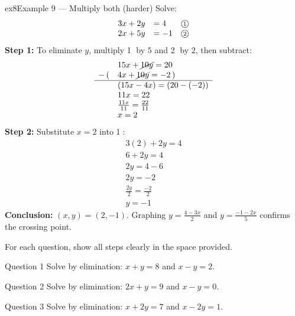 \documentclass[11pt]{article}
\begin{document}
\begin{example}{ex8}{Example 9 --- Multiply both (harder)}
Solve:\[\begin{array}{rll} 3x+2y & = 4 & \text{\textcircled{\scriptsize 1}}\\ 2x+5y & = -1 & \text{\textcircled{\scriptsize 2}} \end{array}\]\soln
\textbf{Step 1:} To eliminate $y$, multiply \textcircled{\scriptsize 1} by $5$ and \textcircled{\scriptsize 2} by $2$, then subtract:\[\begin{array}{rl} & 15x+\cancel{10y}=20\\ -\,( & 4x+\cancel{10y}=-2\,)\\ \hline & (15x-4x)=(20-(-2))\\ & 11x=22\\ & \frac{11x}{11}=\frac{22}{11}\\ & x=2 \end{array}\]
\textbf{Step 2:} Substitute $x=2$ into \textcircled{\scriptsize 1}:\[\begin{array}{l} 3(2)+2y=4\\ 6+2y=4\\ 2y=4-6\\ 2y=-2\\ \frac{2y}{2}=\frac{-2}{2}\\ y=-1 \end{array}\]
\textbf{Conclusion:} $(x,y)=(2,-1)$.
Graphing $y=\tfrac{4-3x}2$ and $y=\tfrac{-1-2x}5$ confirms the crossing point.
\end{example}

\clearpage
{}
For each question, show all steps clearly in the space provided.

\begin{qbox}{Question 1}
Solve by elimination: $x+y=8$ and $x-y=2$.\workspace{2.4cm}
\end{qbox}

\begin{qbox}{Question 2}
Solve by elimination: $2x+y=9$ and $x-y=0$.\workspace{2.4cm}
\end{qbox}

\begin{qbox}{Question 3}
Solve by elimination: $x+2y=7$ and $x-2y=1$.\workspace{2.4cm}
\end{qbox}
\end{document}
